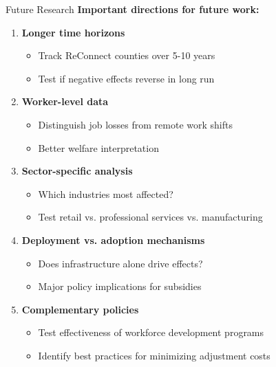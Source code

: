 \documentclass[aspectratio=169]{beamer}
\begin{document}
\begin{frame}{Future Research}
\textbf{Important directions for future work:}

\begin{enumerate}
    \item \textbf{Longer time horizons}
    \begin{itemize}
        \item Track ReConnect counties over 5-10 years
        \item Test if negative effects reverse in long run
    \end{itemize}
    
    
    
    \item \textbf{Worker-level data}
    \begin{itemize}
        \item Distinguish job losses from remote work shifts
        \item Better welfare interpretation
    \end{itemize}
    
    
    
    \item \textbf{Sector-specific analysis}
    \begin{itemize}
        \item Which industries most affected?
        \item Test retail vs. professional services vs. manufacturing
    \end{itemize}
    
    
    
    \item \textbf{Deployment vs. adoption mechanisms}
    \begin{itemize}
        \item Does infrastructure alone drive effects?
        \item Major policy implications for subsidies
    \end{itemize}
    
    
    
    \item \textbf{Complementary policies}
    \begin{itemize}
        \item Test effectiveness of workforce development programs
        \item Identify best practices for minimizing adjustment costs
    \end{itemize}
\end{enumerate}
\end{frame}
\end{document}
